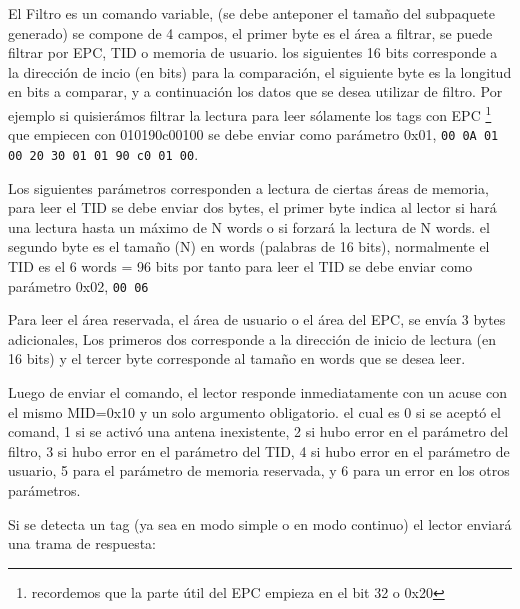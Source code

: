\documentclass[fleqn,10pt]{SelfArx} %
\begin{document}
El Filtro es un comando variable, (se debe anteponer el tamaño del subpaquete generado) se compone de 4 campos, el primer byte es el área a filtrar, se puede filtrar por EPC, TID  o memoria de usuario. los siguientes 16 bits corresponde a la dirección de incio (en bits) para la comparación, el siguiente byte es la longitud en bits a comparar, y a continuación los datos que se desea utilizar de filtro. Por ejemplo si quisierámos filtrar la lectura para leer sólamente los tags con EPC \footnote{recordemos que la parte útil del EPC empieza en el bit 32 o 0x20} que empiecen con 010190c00100 se debe enviar como parámetro 0x01, \lstinline{00 0A 01 00 20 30 01 01 90 c0 01 00}.

Los siguientes parámetros corresponden a lectura de ciertas áreas de memoria, para leer el TID se debe enviar dos bytes, el primer byte indica al lector si hará una lectura hasta un máximo de N words o si forzará la lectura de N words. el segundo byte es el tamaño (N) en words (palabras de 16 bits), normalmente el TID es el 6 words = 96 bits por tanto para leer el TID se debe enviar como parámetro 0x02, \lstinline{00 06}

Para leer el área reservada, el área de usuario o el área del EPC, se envía 3 bytes adicionales, Los primeros dos corresponde a la dirección de inicio de lectura (en 16 bits) y el tercer byte corresponde al tamaño en words que se desea leer. 


Luego de enviar el comando, el lector responde inmediatamente con un acuse con el mismo MID=0x10 y un solo argumento obligatorio. el cual es 0 si se aceptó el comand, 1 si se activó una antena inexistente, 2 si hubo error en el parámetro del filtro, 3 si hubo error en el parámetro del TID, 4 si hubo error en el parámetro de usuario, 5 para el parámetro de memoria reservada, y 6 para un error en los otros parámetros.

Si se detecta un tag (ya sea en modo simple o en modo continuo) el lector enviará una trama de respuesta:
\end{document}
